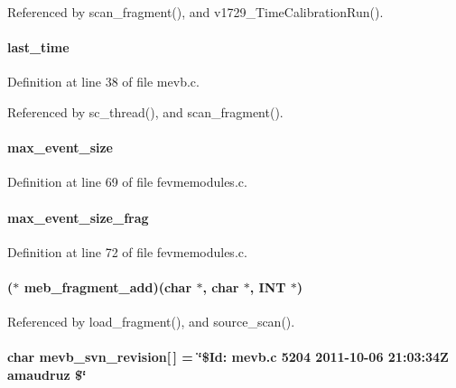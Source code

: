 Referenced by scan\_\-fragment(), and v1729\_\-TimeCalibrationRun().
\paragraph[{last\_\-time}]{ {\bf last\_\-time}}\hfill\label{mevb_8c_a5fecce64b1b883ada4ac0bc410fb3304}


Definition at line 38 of file mevb.c.

Referenced by sc\_\-thread(), and scan\_\-fragment().
\paragraph[{max\_\-event\_\-size}]{ {\bf max\_\-event\_\-size}}\hfill\label{mevb_8c_a13adb6e6b95ca2a62bbfe2453d71a1cd}


Definition at line 69 of file fevmemodules.c.
\paragraph[{max\_\-event\_\-size\_\-frag}]{ {\bf max\_\-event\_\-size\_\-frag}}\hfill\label{mevb_8c_a5593758d19398ebc7c3d58d7f05ec160}


Definition at line 72 of file fevmemodules.c.
\paragraph[{meb\_\-fragment\_\-add}]{($\ast$ {\bf meb\_\-fragment\_\-add})(char $\ast$, char $\ast$, {\bf INT} $\ast$)}\hfill\label{mevb_8c_a9f9e958aee5b923e5f70dcde9887c3dc}


Referenced by load\_\-fragment(), and source\_\-scan().
\paragraph[{mevb\_\-svn\_\-revision}]{\setlength{\rightskip}{0pt plus 5cm}char {\bf mevb\_\-svn\_\-revision}\mbox{[}$\,$\mbox{]} = \char`\"{}\$Id: mevb.c 5204 2011-\/10-\/06 21:03:34Z amaudruz \$\char`\"{}}\hfill\label{mevb_8c_a0c8579ec0c4d461763b34cdd30489b80}



